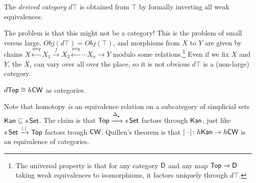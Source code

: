 \begin{definition}
 The \emph{derived category} $d\top$ is obtained from $\top$ by formally inverting all weak equivalences.
\end{definition}
The problem is that this might not be a category! This is the problem of small versus large. $Obj(d\top)=Obj(\top)$, and morphisms from $X$ to $Y$ are given by chains $X\xleftarrow{weq} X_1\xrightarrow{f} X_2\xleftarrow{weq} \cdots X_n\to Y$ modulo some relations.\footnote{The universal property is that for any category $\text{\sf D}$ and any map $\text{\sf Top}\to \text{\sf D}$ taking weak equivalences to isomorphisms, it factors uniquely through $d\top$.} Even if we fix $X$ and $Y$, the $X_i$ can vary over all over the place, so it is not obvious $d\top$ is a (non-large) category.
\begin{theorem}
 $d\text{\sf Top}\cong h\text{\sf CW}$ as categories.
\end{theorem}
Note that homotopy \emph{is} an equivalence relation on a subcategory of simplicial sets $\text{\sf Kan}\subseteq s\operatorname{\sf Set}$. The claim is that $\top\xrightarrow{\Delta_\udot} s\set$ factors through $\text{\sf Kan}$, just like $s\operatorname{\sf Set}\xrightarrow{|\cdot|}\text{\sf Top}$ factors trough $\text{\sf CW}$. Quillen's theorem is that $|\cdot|\colon h\text{\sf Kan}\to h\text{\sf CW}$ is an equivalence of categories.





